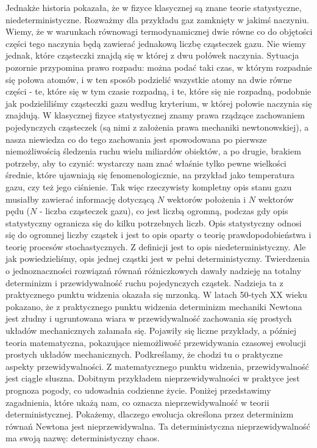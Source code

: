 \documentclass[a4paper,12pt,polish]{sphinxmanual}
\begin{document}
Jednakże historia pokazała, że  w fizyce klasycznej są znane teorie statystyczne, niedeterministyczne.  Rozważmy dla przykładu  gaz zamknięty w jakimś naczyniu. Wiemy, że w warunkach równowagi termodynamicznej dwie równe co do objętości części tego naczynia będą zawierać jednakową liczbę cząsteczek gazu. Nie wiemy jednak, które cząsteczki znajdą się w której z dwu połówek naczynia. Sytuacja pozornie przypomina prawo rozpadu: można podać taki czas, w którym rozpadnie się połowa atomów, i w ten sposób podzielić wszystkie atomy na dwie równe części - te, które się w tym czasie rozpadną, i te, które się nie rozpadną, podobnie jak podzieliliśmy cząsteczki gazu według kryterium, w której połowie naczynia się znajdują. W klasycznej fizyce statystycznej znamy prawa rządzące zachowaniem pojedynczych cząsteczek (są nimi z założenia prawa mechaniki newtonowskiej), a nasza niewiedza co do tego zachowania jest spowodowana po pierwsze niemożliwością śledzenia ruchu wielu miliardów obiektów, a po drugie, brakiem potrzeby, aby to czynić: wystarczy nam znać właśnie tylko pewne wielkości średnie, które ujawniają się fenomenologicznie, na przykład jako temperatura gazu, czy też jego ciśnienie. Tak więc rzeczywisty kompletny opis stanu gazu musiałby zawierać informację dotyczącą $N$ wektorów położenia i $N$ wektorów pędu ($N$ - liczba cząsteczek gazu), co jest liczbą ogromną, podczas gdy opis statystyczny ogranicza się do kilku potrzebnych liczb. Opis statystyczny odnosi się do ogromnej liczby cząstek i jest to opis oparty o teorię prawdopodobieństwa i teorię procesów stochastycznych. Z definicji jest to opis niedeterministyczny. Ale jak powiedzieliśmy, opis jednej cząstki jest w pełni deterministyczny. Twierdzenia o jednoznaczności rozwiązań równań różniczkowych dawały nadzieję na totalny determinizm i przewidywalność ruchu pojedynczych cząstek. Nadzieja ta z praktycznego punktu widzenia okazała się mrzonką.  W latach 50-tych XX wieku pokazano, że z praktycznego punktu widzenia determinizm mechaniki Newtona jest złudny i ugruntowana wiara w przewidywalność zachowania się prostych układów  mechanicznych  załamała się. Pojawiły się liczne przykłady, a później teoria matematyczna, pokazujące  niemożliwość przewidywania czasowej ewolucji prostych układów mechanicznych. Podkreślamy, że chodzi tu o praktyczne aspekty przewidywalności. Z matematycznego punktu widzenia, przewidywalność jest ciągle słuszna.  Dobitnym przykładem nieprzewidywalności w praktyce jest prognoza pogody, co udowadnia codzienne życie. Poniżej przedstawimy zagadnienia, które ukażą nam, co oznacza nieprzewidywalność w teorii deterministycznej. Pokażemy, dlaczego ewolucja określona przez determinizm równań Newtona jest nieprzewidywalna. Ta deterministyczna nieprzewidywalność ma swoją nazwę: deterministyczny chaos.
\end{document}
